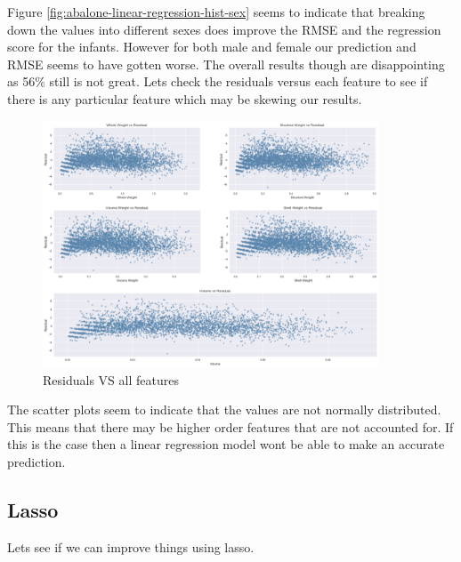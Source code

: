 Figure \ref{fig:abalone-linear-regression-hist-sex} seems to indicate that breaking down the values into different sexes does improve the RMSE and the regression score for the infants. However for both male and female our prediction and RMSE seems to have gotten worse. The overall results though are disappointing as 56\% still is not great. Lets check the residuals versus each feature to see if there is any particular feature which may be skewing our results.
\begin{figure}[H]
  \centering
  \includegraphics[scale=0.5,width=100mm]{./images/abalone-residuals-vs-features.png}
  \caption{Residuals VS all features}
  \label{fig:abalone-residuals-vs-features}
\end{figure}
The scatter plots seem to indicate that the values are not normally distributed. This means that there may be higher order features that are not accounted for. If this is the case then a linear regression model wont be able to make an accurate prediction. 

\subsection{Lasso}

Lets see if we can improve things using lasso.